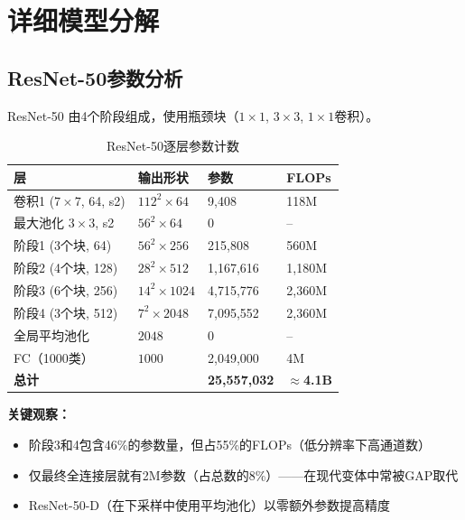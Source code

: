 \section{详细模型分解}

\subsection{ResNet-50参数分析}

ResNet-50 \cite{he2016deep}由4个阶段组成，使用瓶颈块（$1 \times 1$, $3 \times 3$, $1 \times 1$卷积）。

\begin{table}[ht]
    \centering
    \caption{ResNet-50逐层参数计数}
    \begin{tabular}{L{3.5cm} L{3cm} L{2.5cm} L{2.5cm}}
        \toprule
        \textbf{层} & \textbf{输出形状} & \textbf{参数} & \textbf{FLOPs} \\
        \midrule
        卷积1 ($7\times7$, 64, s2) & $112^2 \times 64$ & 9,408 & 118M \\
        最大池化 $3\times3$, s2 & $56^2 \times 64$ & 0 & -- \\
        \midrule
        阶段1 (3个块, 64) & $56^2 \times 256$ & 215,808 & 560M \\
        阶段2 (4个块, 128) & $28^2 \times 512$ & 1,167,616 & 1,180M \\
        阶段3 (6个块, 256) & $14^2 \times 1024$ & 4,715,776 & 2,360M \\
        阶段4 (3个块, 512) & $7^2 \times 2048$ & 7,095,552 & 2,360M \\
        \midrule
        全局平均池化 & $2048$ & 0 & -- \\
        FC（1000类） & $1000$ & 2,049,000 & 4M \\
        \midrule
        \textbf{总计} & & \textbf{25,557,032} & \textbf{$\approx$4.1B} \\
        \bottomrule
    \end{tabular}
\end{table}

\textbf{关键观察：}
\begin{itemize}
    \item 阶段3和4包含46\%的参数量，但占55\%的FLOPs（低分辨率下高通道数）
    \item 仅最终全连接层就有2M参数（占总数的8\%）——在现代变体中常被GAP取代
    \item ResNet-50-D（在下采样中使用平均池化）以零额外参数提高精度
\end{itemize}

